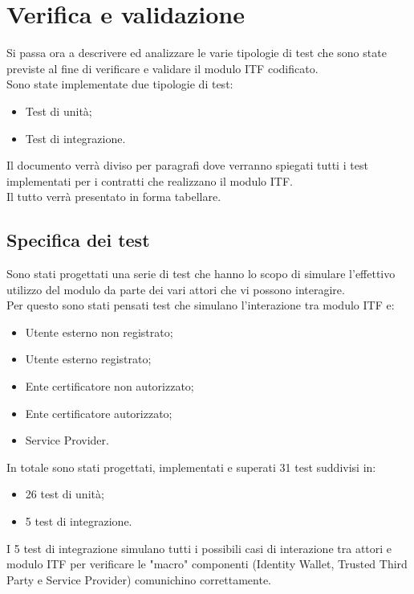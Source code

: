
\chapter{Verifica e validazione}
\label{cap:verifica_validazione}
Si passa ora a descrivere ed analizzare le varie tipologie di test che sono state previste al fine di verificare e validare il modulo \gls{ITF} codificato.\\
Sono state implementate due tipologie di test:
\begin{itemize}
	\item Test di unità;
	\item Test di integrazione.
\end{itemize}
Il documento verrà diviso per paragrafi dove verranno spiegati tutti i test implementati per i contratti che realizzano il modulo \gls{ITF}.\\
Il tutto verrà presentato in forma tabellare.
\section{Specifica dei test}
Sono stati progettati una serie di test che hanno lo scopo di simulare l'effettivo utilizzo del modulo da parte dei vari attori che vi possono interagire.\\
Per questo sono stati pensati test che simulano l'interazione tra modulo \gls{ITF} e:
\begin{itemize}
	\item Utente esterno non registrato;
	\item Utente esterno registrato;
	\item Ente certificatore non autorizzato;
	\item Ente certificatore autorizzato;
	\item Service Provider.
\end{itemize}
In totale sono stati progettati, implementati e superati 31 test suddivisi in:
\begin{itemize}
	\item 26 test di unità;
	\item 5 test di integrazione.
\end{itemize}
I 5 test di integrazione simulano tutti i possibili casi di interazione tra attori e modulo \gls{ITF} per verificare le "macro" componenti (Identity Wallet, Trusted Third Party e Service Provider) comunichino correttamente.
